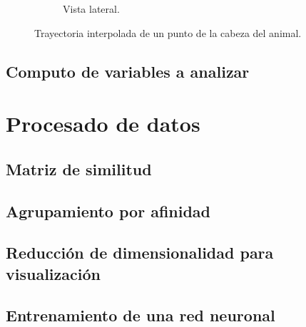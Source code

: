 \begin{figure}[H]
\begin{subfigure}{0.45\textwidth}
    \caption{Vista lateral.}
  \end{subfigure}
  \caption{Trayectoria interpolada de un punto de la cabeza del animal.}
  \label{fig:interpolated-trayectories}
\end{figure}


\subsection{Computo de variables a analizar}

\newpage
\section{Procesado de datos}

\subsection{Matriz de similitud}

\subsection{Agrupamiento por afinidad}

\subsection{Reducción de dimensionalidad para visualización}

\subsection{Entrenamiento de una red neuronal}


